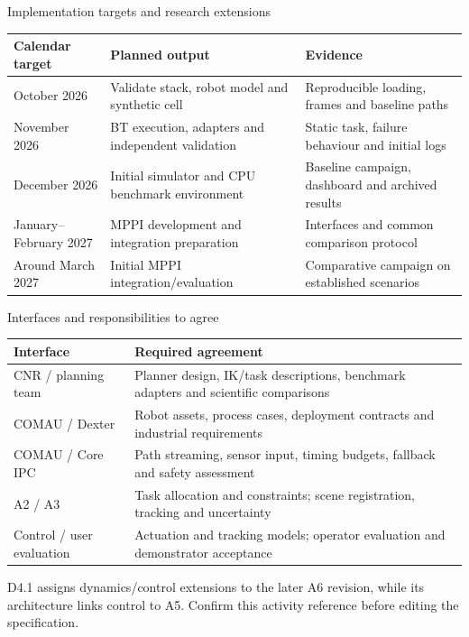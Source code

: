 \documentclass[aspectratio=169,10pt]{beamer}
\begin{document}
\begin{frame}{Implementation targets and research extensions}
\small\renewcommand{\arraystretch}{1.3}
\begin{tabularx}{\textwidth}{@{}p{}XX@{}}
\toprule
Calendar target & Planned output & Evidence\\\midrule
October 2026 & Validate stack, robot model and synthetic cell & Reproducible loading, frames and baseline paths\\
November 2026 & BT execution, adapters and independent validation & Static task, failure behaviour and initial logs\\
December 2026 & Initial simulator and CPU benchmark environment & Baseline campaign, dashboard and archived results\\
January--February 2027 & MPPI development and integration preparation & Interfaces and common comparison protocol\\
Around March 2027 & Initial MPPI integration/evaluation & Comparative campaign on established scenarios\\\bottomrule
\end{tabularx}
\end{frame}

\begin{frame}{Interfaces and responsibilities to agree}
\small\renewcommand{\arraystretch}{1.3}
\begin{tabularx}{\textwidth}{@{}p{}X@{}}
\toprule
Interface & Required agreement\\\midrule
CNR / planning team & Planner design, IK/task descriptions, benchmark adapters and scientific comparisons\\
COMAU / Dexter & Robot assets, process cases, deployment contracts and industrial requirements\\
COMAU / Core IPC & Path streaming, sensor input, timing budgets, fallback and safety assessment\\
A2 / A3 & Task allocation and constraints; scene registration, tracking and uncertainty\\
Control / user evaluation & Actuation and tracking models; operator evaluation and demonstrator acceptance\\\bottomrule
\end{tabularx}\par\medskip\small D4.1 assigns dynamics/control extensions to the later A6 revision, while its architecture links control to A5. Confirm this activity reference before editing the specification.
\end{frame}
\end{document}
